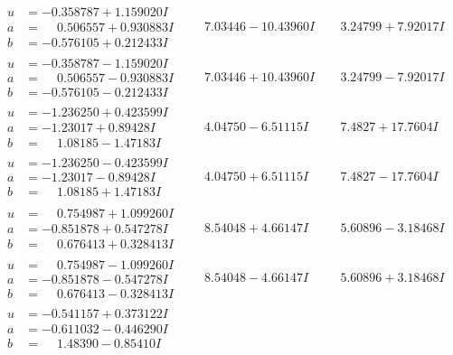 \documentclass[1p]{elsarticle_modified}
\theoremstyle{definition}
\begin{document}
$$\begin{array}{c|c|c}
\begin{aligned}
u &= -0.358787 + 1.159020 I \\
a &= \phantom{-}0.506557 + 0.930883 I \\
b &= -0.576105 + 0.212433 I\end{aligned}
 & \phantom{-}7.03446 - 10.43960 I & \phantom{-}3.24799 + 7.92017 I \\ \hline\begin{aligned}
u &= -0.358787 - 1.159020 I \\
a &= \phantom{-}0.506557 - 0.930883 I \\
b &= -0.576105 - 0.212433 I\end{aligned}
 & \phantom{-}7.03446 + 10.43960 I & \phantom{-}3.24799 - 7.92017 I \\ \hline\begin{aligned}
u &= -1.236250 + 0.423599 I \\
a &= -1.23017 + 0.89428 I \\
b &= \phantom{-}1.08185 - 1.47183 I\end{aligned}
 & \phantom{-}4.04750 - 6.51115 I & \phantom{-}7.4827 + 17.7604 I \\ \hline\begin{aligned}
u &= -1.236250 - 0.423599 I \\
a &= -1.23017 - 0.89428 I \\
b &= \phantom{-}1.08185 + 1.47183 I\end{aligned}
 & \phantom{-}4.04750 + 6.51115 I & \phantom{-}7.4827 - 17.7604 I \\ \hline\begin{aligned}
u &= \phantom{-}0.754987 + 1.099260 I \\
a &= -0.851878 + 0.547278 I \\
b &= \phantom{-}0.676413 + 0.328413 I\end{aligned}
 & \phantom{-}8.54048 + 4.66147 I & \phantom{-}5.60896 - 3.18468 I \\ \hline\begin{aligned}
u &= \phantom{-}0.754987 - 1.099260 I \\
a &= -0.851878 - 0.547278 I \\
b &= \phantom{-}0.676413 - 0.328413 I\end{aligned}
 & \phantom{-}8.54048 - 4.66147 I & \phantom{-}5.60896 + 3.18468 I \\ \hline\begin{aligned}
u &= -0.541157 + 0.373122 I \\
a &= -0.611032 - 0.446290 I \\
b &= \phantom{-}1.48390 - 0.85410 I\end{aligned}

\end{array}$$
\end{document}
